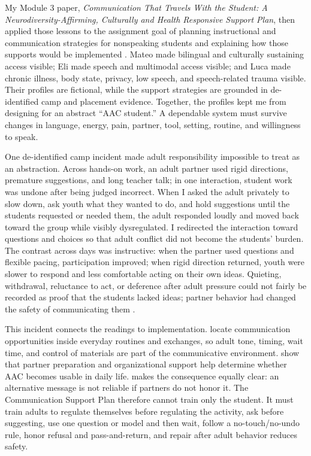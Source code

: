 My Module 3 paper, \textit{Communication That Travels With the Student: A Neurodiversity-Affirming, Culturally and Health Responsive Support Plan}, then applied those lessons to the assignment goal of planning instructional and communication strategies for nonspeaking students and explaining how those supports would be implemented \citep{garciabautista2026communicationplan}. Mateo made bilingual and culturally sustaining access visible; Eli made speech and multimodal access visible; and Luca made chronic illness, body state, privacy, low speech, and speech-related trauma visible. Their profiles are fictional, while the support strategies are grounded in de-identified camp and placement evidence. Together, the profiles kept me from designing for an abstract ``AAC student.'' A dependable system must survive changes in language, energy, pain, partner, tool, setting, routine, and willingness to speak.


One de-identified camp incident made adult responsibility impossible to treat as an abstraction. Across hands-on work, an adult partner used rigid directions, premature suggestions, and long teacher talk; in one interaction, student work was undone after being judged incorrect. When I asked the adult privately to slow down, ask youth what they wanted to do, and hold suggestions until the students requested or needed them, the adult responded loudly and moved back toward the group while visibly dysregulated. I redirected the interaction toward questions and choices so that adult conflict did not become the students' burden. The contrast across days was instructive: when the partner used questions and flexible pacing, participation improved; when rigid direction returned, youth were slower to respond and less comfortable acting on their own ideas. Quieting, withdrawal, reluctance to act, or deference after adult pressure could not fairly be recorded as proof that the students lacked ideas; partner behavior had changed the safety of communicating them \citep{campEvidence2026,garciabautista2026communicationplan}.

This incident connects the readings to implementation. \citet{downing2015classroom} locate communication opportunities inside everyday routines and exchanges, so adult tone, timing, wait time, and control of materials are part of the communicative environment. \citet{norrie2021context} show that partner preparation and organizational support help determine whether AAC becomes usable in daily life. \citet{peckhamhardin2015behavior} makes the consequence equally clear: an alternative message is not reliable if partners do not honor it. The Communication Support Plan therefore cannot train only the student. It must train adults to regulate themselves before regulating the activity, ask before suggesting, use one question or model and then wait, follow a no-touch/no-undo rule, honor refusal and pass-and-return, and repair after adult behavior reduces safety.

